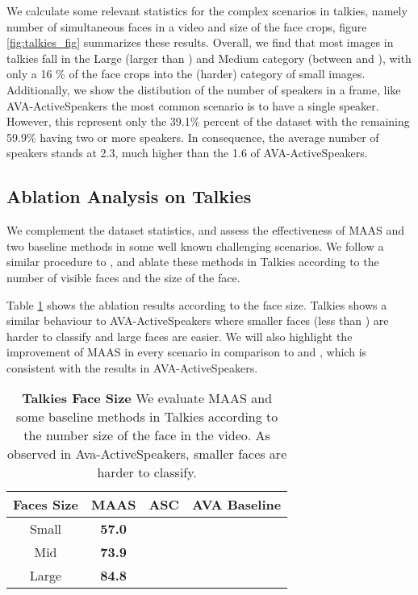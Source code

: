 \documentclass[10pt,twocolumn,letterpaper]{article}
\begin{document}
We calculate some relevant statistics for the complex scenarios in talkies, namely number of simultaneous faces in a video and size of the face crops, figure \ref{fig:talkies_fig} summarizes these results.  Overall, we find that most images in talkies fall in the Large (larger than ) and Medium category (between  and ), with only a 16 \% of the face crops into the (harder) category of small images. Additionally, we show the distibution of the number of speakers in a frame, like AVA-ActiveSpeakers the most common scenario is to have a single speaker. However, this represent only the 39.1\% percent of the dataset with the remaining 59.9\% having two or more speakers. In consequence, the average number of speakers stands at 2.3, much higher than the 1.6 of AVA-ActiveSpeakers.

\subsection{Ablation Analysis on Talkies}
We complement the dataset statistics, and assess the effectiveness of MAAS and two baseline methods in some well known challenging scenarios. We follow a similar procedure to \cite{roth2019ava}, and ablate these methods in Talkies according to the number of visible faces and the  size of the face.

Table \ref{tab:talkies_size} shows the ablation results according to the face size. Talkies shows a similar behaviour to AVA-ActiveSpeakers where smaller faces (less than ) are harder to classify and large faces are easier. We will also highlight the improvement of MAAS in every scenario in comparison to \cite{roth2019ava} and \cite{alcazar2020active}, which is consistent with the results in AVA-ActiveSpeakers. 


\begin{table}[t]
    \small
    \centering
      \begin{tabular}{c c c c }
        \hline
        \textbf{Faces Size} & \textbf{MAAS}  & \textbf{ASC}  \cite{alcazar2020active} &  \textbf{AVA Baseline} \cite{roth2019ava} \\
        \hline 
        Small & \textbf{57.0} &   &  \\
        Mid & \textbf{73.9} &  &\\
        Large & \textbf{84.8} &  &  \\
        \hline
    \end{tabular}
    \caption{\textbf{Talkies Face Size}  We evaluate MAAS and some baseline methods in Talkies according to the number size of the face in the video. As observed in Ava-ActiveSpeakers, smaller faces are harder to classify.
    }
    \label{tab:talkies_size}
\end{table}
\end{document}
